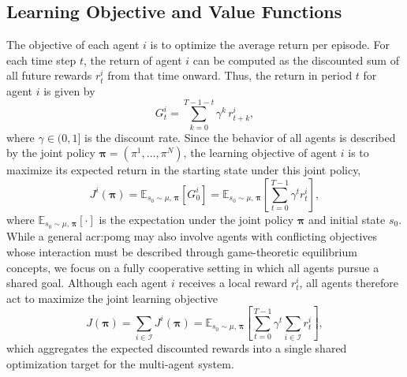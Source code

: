 \subsection{Learning Objective and Value Functions}
\label{sec:objective-values}
The objective of each agent $i$ is to optimize the average return per episode. For each time step $t$, the return of agent $i$ can be computed as the discounted sum of all future rewards $r_t^i$ from that time onward. Thus, the return in period $t$ for agent $i$ is given by
\begin{equation}
    G^i_t = \sum_{k=0}^{T-1-t} \gamma^{k}\, r^i_{t+k},
\end{equation}
where $\gamma\in (0,1]$ is the discount rate. Since the behavior of all agents is described by the joint policy  $\boldsymbol{\pi} = (\pi^1, \dots, \pi^N)$, the learning objective of agent $i$ is to maximize its expected return in the starting state under this joint policy, 
\begin{equation}
    J^i(\boldsymbol{\pi}) = \mathbb{E}_{s_0\sim\mu,\,\boldsymbol{\pi}}\!\left[ G^i_0 \right] 
    = \mathbb{E}_{s_0\sim\mu,\,\boldsymbol{\pi}}\!\left[\sum_{t=0}^{T-1} \gamma^t r^i_t \right],
\end{equation}
where $\mathbb{E}_{s_0\sim\mu,\,\boldsymbol{\pi}} [ \cdot ]$ is the expectation under the joint policy $\boldsymbol{\pi}$ and initial state $s_0$. While a general \gls{acr:pomg} may also involve agents with conflicting objectives whose interaction must be described through game-theoretic equilibrium concepts, we focus on a fully cooperative setting in which all agents pursue a shared goal. Although each agent $i$ receives a local reward $r^i_t$, all agents therefore act to maximize the joint learning objective
\begin{equation}
    J(\boldsymbol{\pi}) 
    = \sum_{i \in \mathcal{I}} J^i(\boldsymbol{\pi}) 
    = \mathbb{E}_{s_0\sim\mu,\,\boldsymbol{\pi}}\!\left[
        \sum_{t=0}^{T-1} \gamma^t \sum_{i \in \mathcal{I}} r^i_t
      \right],
\end{equation}
which aggregates the expected discounted rewards into a single shared optimization target for the multi-agent system.

